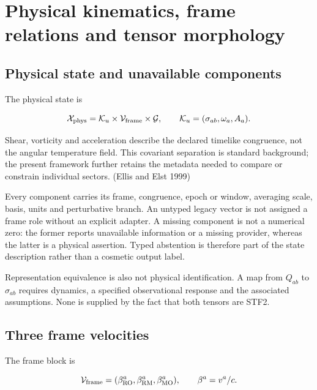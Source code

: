 \documentclass[
  11pt,
  a4paper]{article}
\begin{document}
\hypertarget{physical-kinematics-frame-relations-and-tensor-morphology}{%
\section{Physical kinematics, frame relations and tensor morphology}\label{physical-kinematics-frame-relations-and-tensor-morphology}}

\hypertarget{physical-state-and-unavailable-components}{%
\subsection{Physical state and unavailable components}\label{physical-state-and-unavailable-components}}

The physical state is

\[
\mathcal X_{\rm phys}
=\mathcal K_u\times\mathcal V_{\rm frame}\times\mathcal G,
\qquad \mathcal K_u=(\sigma_{ab},\omega_a,A_a).
\]

Shear, vorticity and acceleration describe the declared timelike congruence, not the angular temperature field. This covariant separation is standard background; the present framework further retains the metadata needed to compare or constrain individual sectors. (Ellis and Elst 1999)

Every component carries its frame, congruence, epoch or window, averaging scale, basis, units and perturbative branch. An untyped legacy vector is not assigned a frame role without an explicit adapter. A missing component is not a numerical zero: the former reports unavailable information or a missing provider, whereas the latter is a physical assertion. Typed abstention is therefore part of the state description rather than a cosmetic output label.

Representation equivalence is also not physical identification. A map from \(Q_{ab}\) to \(\sigma_{ab}\) requires dynamics, a specified observational response and the associated assumptions. None is supplied by the fact that both tensors are STF2.

\hypertarget{three-frame-velocities}{%
\subsection{Three frame velocities}\label{three-frame-velocities}}

The frame block is

\[
\mathcal V_{\rm frame}
=(\beta_{\rm RO}^a,\beta_{\rm RM}^a,\beta_{\rm MO}^a),
\qquad \beta^a=v^a/c.
\]
\end{document}
